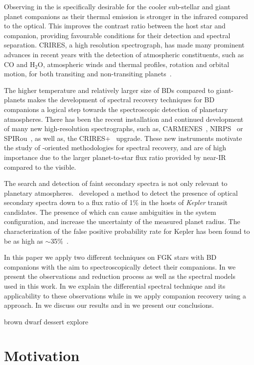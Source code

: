 Observing in the \nir{}is specifically desirable for the cooler sub-stellar and giant planet companions as their thermal emission is stronger in the infrared compared to the optical. This improves the contrast ratio between the host star and companion, providing favourable conditions for their detection and spectral separation. CRIRES, a high resolution \nir{} spectrograph, has made many prominent advances in recent years with the detection of atmospheric constituents, such as \(\textrm{CO} \) and \(\textrm{H}_{2}\textrm{O} \), atmospheric winds and thermal profiles, rotation and orbital motion, for both transiting and non-transiting planets~\citep[e.g.][]{snellen_orbital_2010, brogi_signature_2012, rodler_weighing_2012, dekok_detection_2013, brogi_carbon_2014, snellen_fast_2014, piskorz_evidence_2016, brogi_rotation_2016, birkby_discovery_2017}.

The higher temperature and relatively larger size of BDs compared to giant-planets makes the development of spectral recovery techniques for BD companions a logical step towards the spectroscopic detection of planetary atmospheres. There has been the recent installation and continued development of many new high-resolution \nir{}spectrographs, such as, {CARMENES}~\citep{quirrenbach_carmenes_2014}, NIRPS~\citep{bouchy_nearinfrared_2017} or SPIRou~\citep{artigau_spirou_2014}, as well as, the {CRIRES+}~\citep{dorn_crires_2016} upgrade. These new instruments motivate the study of \nir{}-oriented methodologies for spectral recovery, and are of high importance due to the larger planet-to-star flux ratio provided by near-IR compared to the visible.

{\rd{} The search and detection of faint secondary spectra is not only relevant to planetary atmospheres.~\citet{kolbl_detection_2015} developed a method to detect the presence of optical secondary spectra down to a flux ratio of 1\% in the hosts of \emph{Kepler} transit candidates. The presence of which can cause ambiguities in the system configuration, and increase the uncertainty of the measured planet radius. The characterization of the false positive probability rate for Kepler has been found to be as high as  \(\sim\)35\%~\citet{santerne_sophie_2012}.}

In this paper we apply two different techniques on FGK stars with BD companions with the aim to spectroscopically detect their companions. In  we present the observations and reduction process as well as the spectral models used in this work. In  we explain the differential spectral technique and its applicability to these observations while in  we apply companion recovery using a \textchisquared{} approach. In  we discuss our results and in  we present our conclusions.



brown dwarf dessert explore \citet{ranc_moa2007blg197_2015}

\section{Motivation}
